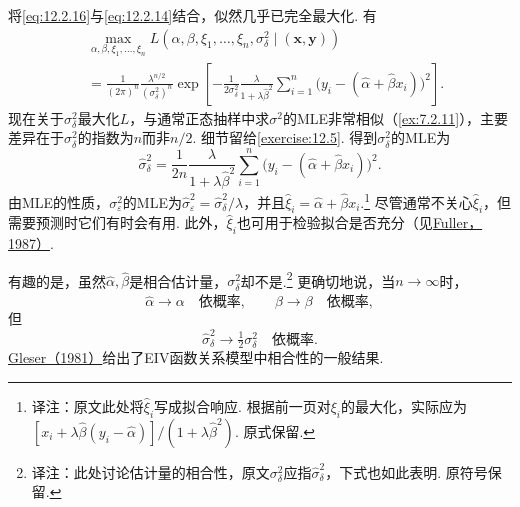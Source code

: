 将\eqref{eq:12.2.16}与\eqref{eq:12.2.14}结合，似然几乎已完全最大化. 有
\begin{equation}\label{eq:12.2.17}
\begin{aligned}
&\max_{\alpha,\beta,\xi_1,\ldots,\xi_n}L(\alpha,\beta,\xi_1,\ldots,\xi_n,\sigma_\delta^2\mid(\boldsymbol x,\boldsymbol y))\\
&=\frac1{(2\pi)^n}\frac{\lambda^{n/2}}{(\sigma_\delta^2)^n}
\exp\left[-\frac1{2\sigma_\delta^2}\frac\lambda{1+\lambda\hat\beta^2}\sum_{i=1}^n\bigl(y_i-(\hat\alpha+\hat\beta x_i)\bigr)^2\right].
\end{aligned}
\end{equation}
现在关于$\sigma_\delta^2$最大化$L$，与通常正态抽样中求$\sigma^2$的MLE非常相似（\autoref{ex:7.2.11}），主要差异在于$\sigma_\delta^2$的指数为$n$而非$n/2$. 细节留给\autoref{exercise:12.5}. 得到$\sigma_\delta^2$的MLE为
\begin{equation}\label{eq:12.2.18}
\hat\sigma_\delta^2=\frac1{2n}\frac\lambda{1+\lambda\hat\beta^2}\sum_{i=1}^n\bigl(y_i-(\hat\alpha+\hat\beta x_i)\bigr)^2.
\end{equation}
由MLE的性质，$\sigma_\varepsilon^2$的MLE为$\hat\sigma_\varepsilon^2=\hat\sigma_\delta^2/\lambda$，并且$\hat\xi_i=\hat\alpha+\hat\beta x_i$.\footnote{译注：原文此处将$\hat\xi_i$写成拟合响应. 根据前一页对$\xi_i$的最大化，实际应为$[x_i+\lambda\hat\beta(y_i-\hat\alpha)]/(1+\lambda\hat\beta^2)$. 原式保留.} 尽管通常不关心$\hat\xi_i$，但需要预测时它们有时会有用. 此外，$\hat\xi_i$也可用于检验拟合是否充分（见\hyperref[bib:source130]{Fuller，1987）}.

有趣的是，虽然$\hat\alpha,\hat\beta$是相合估计量，$\sigma_\delta^2$却不是.\footnote{译注：此处讨论估计量的相合性，原文$\sigma_\delta^2$应指$\hat\sigma_\delta^2$，下式也如此表明. 原符号保留.} 更确切地说，当$n\to\infty$时，
$$\hat\alpha\to\alpha\quad\text{依概率},\qquad\hat\beta\to\beta\quad\text{依概率},$$
但
$$\hat\sigma_\delta^2\to\tfrac12\sigma_\delta^2\quad\text{依概率}.$$
\hyperref[bib:source143]{Gleser（1981）}给出了EIV函数关系模型中相合性的一般结果.

